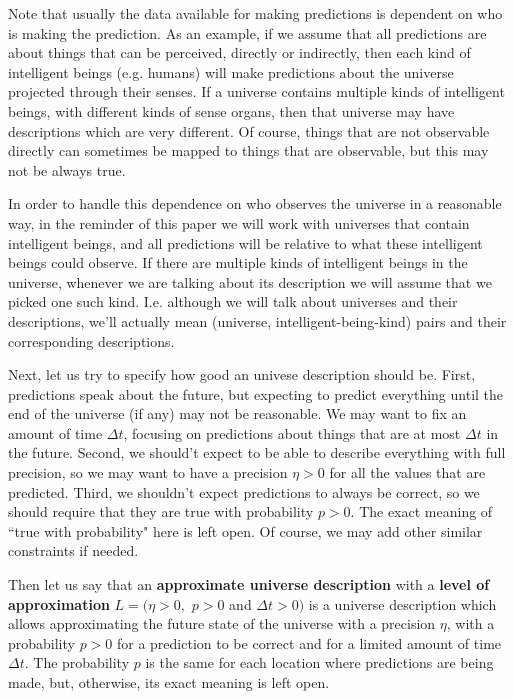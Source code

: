\documentclass[a4paper
,draft
]{article}
\newcommand{\definitie}[1]{\textbf{#1}}
\newcommand{\ghilimele}[1]{``#1"}
\begin{document}
Note that usually the data available for making predictions is dependent
on who is making the prediction. As an example, if we assume that
all predictions are about things that can be perceived, directly or indirectly,
then
each kind of intelligent beings (e.g. humans) will make predictions
about the universe projected through their senses. If a universe contains
multiple kinds of intelligent beings, with different kinds of
sense organs, then that universe may have descriptions which are
very different.
Of course, things that are not observable directly can sometimes be mapped
to things that are observable, but this may not be always true.

In order to handle this dependence on who observes the universe
in a reasonable way, in the reminder of this paper we will work with universes
that contain intelligent beings,
and all predictions will be relative to what these intelligent beings
could observe.
If there are multiple kinds of intelligent beings in the
universe, whenever we are talking about its description
we will assume that we picked one such kind.
I.e. although we
will talk about universes and their descriptions, we'll actually mean
(universe, intelligent-being-kind) pairs and their corresponding descriptions.

Next, let us try to specify how good an univese description
should be. First, predictions speak about the future, but expecting to
predict everything until the end of the universe (if any) may not be
reasonable. We may want to fix an amount of time $\Delta t$,
focusing on predictions about things that are at most
$\Delta t$ in the future. Second, we should't expect to
be able to describe everything with full precision, so we may want to
have a precision $\eta>0$ for all the values that are predicted.
Third, we shouldn't expect predictions to always be correct, so
we should require that they are true with probability $p>0$.
The exact meaning of \ghilimele{true with probability} here is left open.
Of course, we may add other similar constraints if needed.

Then let us say that an \definitie{approximate universe description} with a
\definitie{level of approximation} $L=(\eta>0,$ $p>0$ and $\Delta t>0)$
is a universe description which allows approximating the future
state of the universe with a precision $\eta$, with a probability
$p>0$ for a prediction to be correct
and for a limited amount of time $\Delta t$.
The probability $p$ is the same for each location
where predictions are being made, but, otherwise, its exact meaning
is left open.
\end{document}
